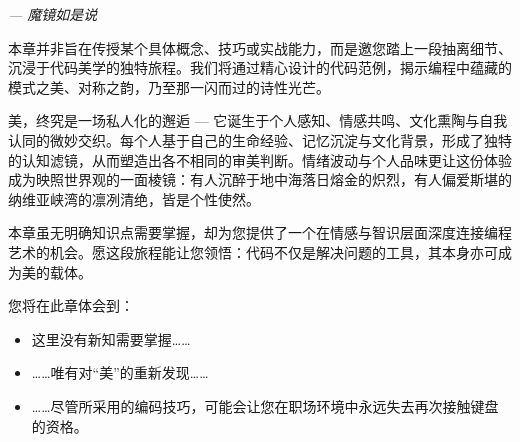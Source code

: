\begin{flushright}
\textit{--- 魔镜如是说}
\end{flushright}

本章并非旨在传授某个具体概念、技巧或实战能力，而是邀您踏上一段抽离细节、沉浸于代码美学的独特旅程。我们将通过精心设计的代码范例，揭示编程中蕴藏的模式之美、对称之韵，乃至那一闪而过的诗性光芒。

美，终究是一场私人化的邂逅 --- 它诞生于个人感知、情感共鸣、文化熏陶与自我认同的微妙交织。每个人基于自己的生命经验、记忆沉淀与文化背景，形成了独特的认知滤镜，从而塑造出各不相同的审美判断。情绪波动与个人品味更让这份体验成为映照世界观的一面棱镜：有人沉醉于地中海落日熔金的炽烈，有人偏爱斯堪的纳维亚峡湾的凛冽清绝，皆是个性使然。

本章虽无明确知识点需要掌握，却为您提供了一个在情感与智识层面深度连接编程艺术的机会。愿这段旅程能让您领悟：代码不仅是解决问题的工具，其本身亦可成为美的载体。

您将在此章体会到：

\begin{itemize}
\item 
这里没有新知需要掌握……

\item 
……唯有对“美”的重新发现……

\item 
……尽管所采用的编码技巧，可能会让您在职场环境中永远失去再次接触键盘的资格。
\end{itemize}


























